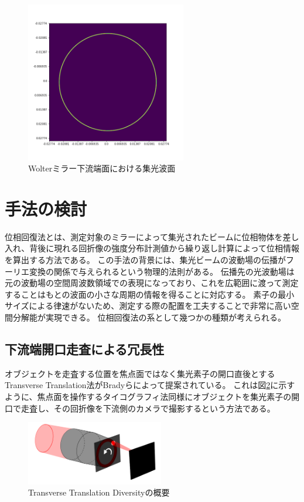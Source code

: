 \documentclass[a4j]{jarticle}
\begin{document}
\begin{figure}[h!]
\centering
\includegraphics[width=7cm]{../thesis/chap1/figure/wolter_thinring.png}
\caption{Wolterミラー下流端面における集光波面}
\label{fig:wolter_thinring}
\end{figure}

\section{手法の検討}

位相回復法とは、測定対象のミラーによって集光されたビームに位相物体を差し入れ、背後に現れる回折像の強度分布計測値から繰り返し計算によって位相情報を算出する方法である。
この手法の背景には、集光ビームの波動場の伝播がフーリエ変換の関係で与えられるという物理的法則がある。
伝播先の光波動場は元の波動場の空間周波数領域での表現になっており、これを広範囲に渡って測定することはもとの波面の小さな周期の情報を得ることに対応する。
素子の最小サイズによる律速がないため、測定する際の配置を工夫することで非常に高い空間分解能が実現できる。
位相回復法の系として幾つかの種類が考えられる。


\subsection{下流端開口走査による冗長性}
\label{chap3_transverse_introduction}

オブジェクトを走査する位置を焦点面ではなく集光素子の開口直後とするTransverse Translation法がBradyらによって提案されている。\cite{Brady2009}
これは図\ref{fig:transverse_schematic}に示すように、焦点面を操作するタイコグラフィ法同様にオブジェクトを集光素子の開口で走査し、その回折像を下流側のカメラで撮影するという方法である。

\begin{figure}[!ht]
\centering
\includegraphics[width=6cm]{../thesis/chap3/figure/transverse_schematic.png}
\caption{Transverse Translation Diversityの概要}
\label{fig:transverse_schematic}
\end{figure}
\end{document}
